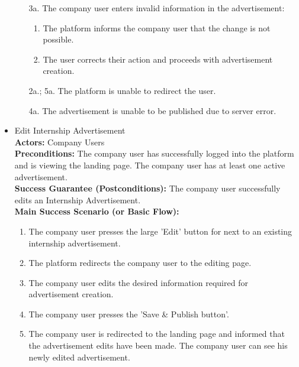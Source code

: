 \begin{itemize}[label={[\textbf{UC}]}, align=left, leftmargin=*]
\begin{enumerate}[label=\arabic*.]
        \item[3a.] The company user enters invalid information in the advertisement:
            \begin{enumerate}[label=\arabic*.]
                \item The platform informs the company user that the change is not possible.
                \item The user corrects their action and proceeds with advertisement creation.
            \end{enumerate}
        \item[2a.; 5a.] The platform is unable to redirect the user.
        \item[4a.] The advertisement is unable to be published due to server error.
        \end{enumerate}

     \item {} Edit Internship Advertisement \\
     \textbf{Actors:} Company Users\\
     \textbf{Preconditions:} The company user has successfully logged into the platform and is viewing the landing page. The company user has at least one active advertisement.\\
     \textbf{Success Guarantee (Postconditions):} The company user successfully edits an Internship Advertisement. \\
     \textbf{Main Success Scenario (or Basic Flow):} 
     \begin{enumerate}[label=\arabic*.] 
        \item The company user presses the large 'Edit' button for next to an existing internship advertisement. 
        \item The platform redirects the company user to the editing page.
        \item The company user edits the desired information required for advertisement creation.
        \item The company user presses the 'Save \& Publish button'.
        \item The company user is redirected to the landing page and informed that the advertisement edits have been made. The company user can see his newly edited advertisement.
     \end{enumerate} \\


\end{itemize}
